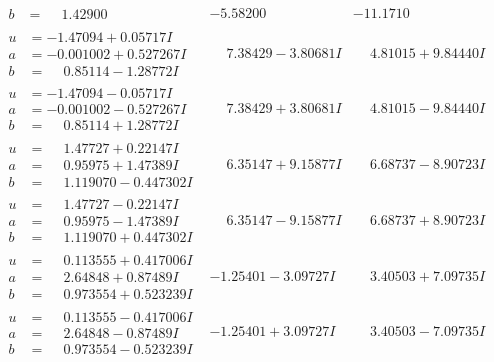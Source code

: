 \documentclass[1p]{elsarticle_modified}
\theoremstyle{definition}
\begin{document}
$$\begin{array}{c|c|c}
\begin{aligned}
b &= \phantom{-}1.42900\phantom{ +0.000000I}\end{aligned}
 & -5.58200\phantom{ +0.000000I} & -11.1710\phantom{ +0.000000I} \\ \hline\begin{aligned}
u &= -1.47094 + 0.05717 I \\
a &= -0.001002 + 0.527267 I \\
b &= \phantom{-}0.85114 - 1.28772 I\end{aligned}
 & \phantom{-}7.38429 - 3.80681 I & \phantom{-}4.81015 + 9.84440 I \\ \hline\begin{aligned}
u &= -1.47094 - 0.05717 I \\
a &= -0.001002 - 0.527267 I \\
b &= \phantom{-}0.85114 + 1.28772 I\end{aligned}
 & \phantom{-}7.38429 + 3.80681 I & \phantom{-}4.81015 - 9.84440 I \\ \hline\begin{aligned}
u &= \phantom{-}1.47727 + 0.22147 I \\
a &= \phantom{-}0.95975 + 1.47389 I \\
b &= \phantom{-}1.119070 - 0.447302 I\end{aligned}
 & \phantom{-}6.35147 + 9.15877 I & \phantom{-}6.68737 - 8.90723 I \\ \hline\begin{aligned}
u &= \phantom{-}1.47727 - 0.22147 I \\
a &= \phantom{-}0.95975 - 1.47389 I \\
b &= \phantom{-}1.119070 + 0.447302 I\end{aligned}
 & \phantom{-}6.35147 - 9.15877 I & \phantom{-}6.68737 + 8.90723 I \\ \hline\begin{aligned}
u &= \phantom{-}0.113555 + 0.417006 I \\
a &= \phantom{-}2.64848 + 0.87489 I \\
b &= \phantom{-}0.973554 + 0.523239 I\end{aligned}
 & -1.25401 - 3.09727 I & \phantom{-}3.40503 + 7.09735 I \\ \hline\begin{aligned}
u &= \phantom{-}0.113555 - 0.417006 I \\
a &= \phantom{-}2.64848 - 0.87489 I \\
b &= \phantom{-}0.973554 - 0.523239 I\end{aligned}
 & -1.25401 + 3.09727 I & \phantom{-}3.40503 - 7.09735 I \\ \hline\begin{aligned}

\end{aligned}
\end{array}$$
\end{document}
